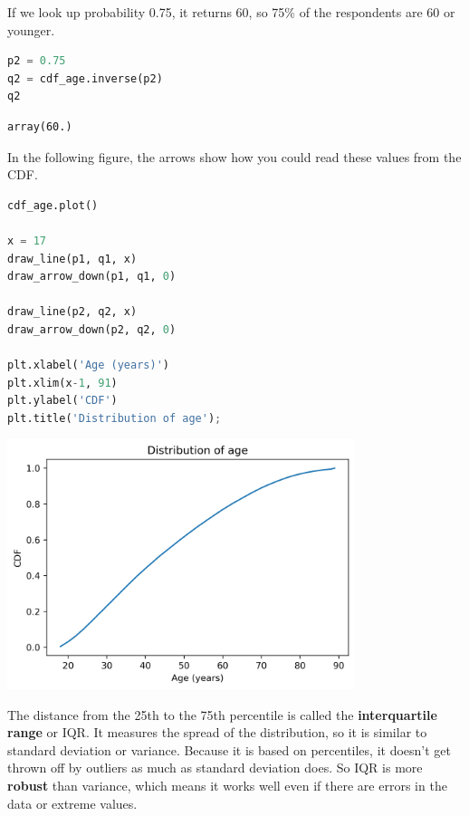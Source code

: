 If we look up probability 0.75, it returns 60, so 75\% of the
respondents are 60 or younger.

\begin{lstlisting}[language=Python,style=source]
p2 = 0.75
q2 = cdf_age.inverse(p2)
q2
\end{lstlisting}

\begin{lstlisting}[style=output]
array(60.)
\end{lstlisting}

In the following figure, the arrows show how you could read these values
from the CDF.

\begin{lstlisting}[language=Python,style=source]
cdf_age.plot()

x = 17
draw_line(p1, q1, x)
draw_arrow_down(p1, q1, 0)

draw_line(p2, q2, x)
draw_arrow_down(p2, q2, 0)

plt.xlabel('Age (years)')
plt.xlim(x-1, 91)
plt.ylabel('CDF')
plt.title('Distribution of age');
\end{lstlisting}

\begin{center}
\includegraphics[width=4in]{chapters/08_distributions_files/08_distributions_67_0.png}
\end{center}

The distance from the 25th to the 75th percentile is called the
\textbf{interquartile range} or IQR. It measures the spread of the
distribution, so it is similar to standard deviation or variance.
Because it is based on percentiles, it doesn't get thrown off by
outliers as much as standard deviation does. So IQR is more
\textbf{robust} than variance, which means it works well even if there
are errors in the data or extreme values.

